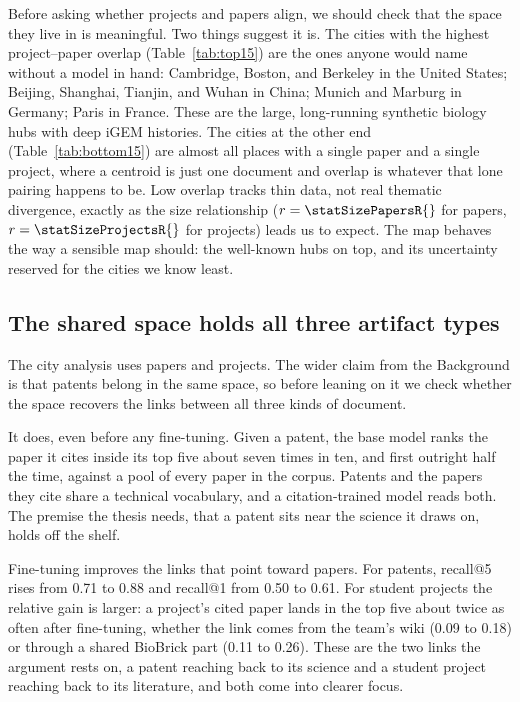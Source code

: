 \documentclass[12pt,a4paper]{article}
\begin{document}
	Before asking whether projects and papers align, we should check that the space
	they live in is meaningful. Two things suggest it is. The cities with the highest
	project--paper overlap (Table~\ref{tab:top15}) are the ones anyone would name
	without a model in hand: Cambridge, Boston, and Berkeley in the United States;
	Beijing, Shanghai, Tianjin, and Wuhan in China; Munich and Marburg in Germany;
	Paris in France. These are the large, long-running synthetic biology hubs with deep
	iGEM histories. The cities at the other end (Table~\ref{tab:bottom15}) are almost
	all places with a single paper and a single project, where a centroid is just one
	document and overlap is whatever that lone pairing happens to be. Low overlap
	tracks thin data, not real thematic divergence, exactly as the size relationship
	($r = \statSizePapersR{}$ for papers, $r = \statSizeProjectsR{}$ for projects)
	leads us to expect. The map behaves the way a sensible map should: the well-known
	hubs on top, and its uncertainty reserved for the cities we know least.
	
	
	
	\subsection{The shared space holds all three artifact types}
	
	The city analysis uses papers and projects. The wider claim from the Background is
	that patents belong in the same space, so before leaning on it we check whether the
	space recovers the links between all three kinds of document.
	
	It does, even before any fine-tuning. Given a patent, the base model ranks the
	paper it cites inside its top five about seven times in ten, and first outright
	half the time, against a pool of every paper in the corpus. Patents and the papers
	they cite share a technical vocabulary, and a citation-trained model reads both.
	The premise the thesis needs, that a patent sits near the science it draws on,
	holds off the shelf.
	
	Fine-tuning improves the links that point toward papers. For patents, recall@5
	rises from 0.71 to 0.88 and recall@1 from 0.50 to 0.61. For student projects the
	relative gain is larger: a project's cited paper lands in the top five about twice
	as often after fine-tuning, whether the link comes from the team's wiki (0.09 to
	0.18) or through a shared BioBrick part (0.11 to 0.26). These are the two links the
	argument rests on, a patent reaching back to its science and a student project
	reaching back to its literature, and both come into clearer focus.
	
\end{document}
